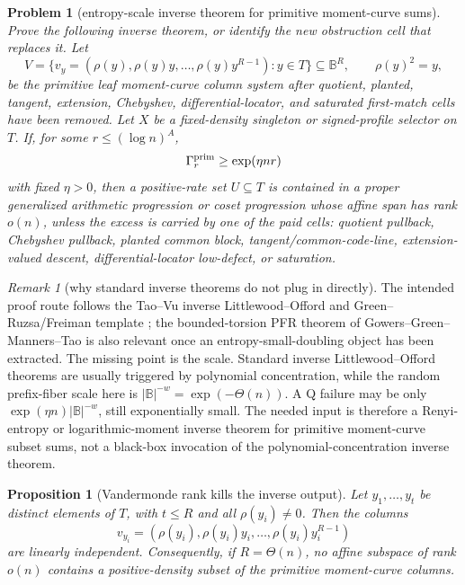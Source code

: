 \documentclass[a4paper,11pt]{amsart}
\newtheorem{proposition}[proposition]{Proposition}
\newtheorem{problem}[problem]{Problem}
\theoremstyle{remark}
\newtheorem{remark}[remark]{Remark}
\newcommand{\B}{\mathbb B}
\begin{document}
\begin{problem}[entropy-scale inverse theorem for primitive moment-curve sums]\label{prob:entropy-inverse-q}
Prove the following inverse theorem, or identify the new obstruction cell that replaces it.  Let
\[
        V=\{v_y=(\rho(y),\rho(y)y,\ldots,\rho(y)y^{R-1}):y\in T\}\subseteq\B^R,
        \qquad
        \rho(y)^2=y,
\]
be the primitive leaf moment-curve column system after quotient, planted, tangent, extension, Chebyshev, differential-locator, and saturated first-match cells have been removed.  Let \(X\) be a fixed-density singleton or signed-profile selector on \(T\).  If, for some \(r\le(\log n)^A\),
\[
        \Gamma_r^{\rm prim}\ge\exp(\eta nr)
\]
with fixed \(\eta>0\), then a positive-rate set \(U\subseteq T\) is contained in a proper generalized arithmetic progression or coset progression whose affine span has rank \(o(n)\), unless the excess is carried by one of the paid cells: quotient pullback, Chebyshev pullback, planted common block, tangent/common-code-line, extension-valued descent, differential-locator low-defect, or saturation.
\end{problem}

\begin{remark}[why standard inverse theorems do not plug in directly]\label{rem:standard-inverse-gap}
The intended proof route follows the Tao--Vu inverse Littlewood--Offord and Green--Ruzsa/Freiman template \cite{TaoVu09,GreenRuzsa07}; the bounded-torsion PFR theorem of Gowers--Green--Manners--Tao \cite{GGMT24} is also relevant once an entropy-small-doubling object has been extracted.  The missing point is the scale.  Standard inverse Littlewood--Offord theorems are usually triggered by polynomial concentration, while the random prefix-fiber scale here is \(|\B|^{-w}=\exp(-\Theta(n))\).  A Q failure may be only \(\exp(\eta n)|\B|^{-w}\), still exponentially small.  The needed input is therefore a Renyi-entropy or logarithmic-moment inverse theorem for primitive moment-curve subset sums, not a black-box invocation of the polynomial-concentration inverse theorem.
\end{remark}

\begin{proposition}[Vandermonde rank kills the inverse output]\label{prop:vandermonde-kills-low-rank}
Let \(y_1,\ldots,y_t\) be distinct elements of \(T\), with \(t\le R\) and all \(\rho(y_i)\ne0\).  Then the columns
\[
        v_{y_i}=(\rho(y_i),\rho(y_i)y_i,\ldots,\rho(y_i)y_i^{R-1})
\]
are linearly independent.  Consequently, if \(R=\Theta(n)\), no affine subspace of rank \(o(n)\) contains a positive-density subset of the primitive moment-curve columns.
\end{proposition}
\end{document}

